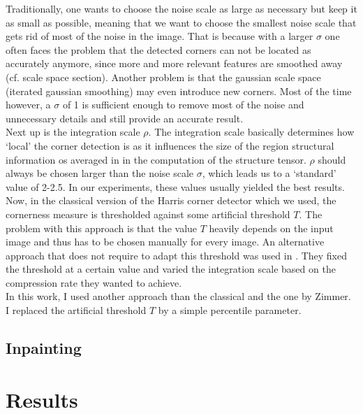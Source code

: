 Traditionally, one wants to choose the noise scale as large as necessary but keep it as small as
possible, meaning that we want to choose the smallest noise scale that gets rid of most of the
noise in the image. That is because with a larger $\sigma$ 
one often faces the problem that the detected corners can not be located as accurately anymore,
since more and more relevant features are smoothed away (cf. scale space section). Another problem
is that the gaussian scale space (iterated gaussian smoothing) may even introduce new corners.
 Most of the time however, a $\sigma$ of 1 is sufficient enough to remove most of the noise and unnecessary
 details and still provide an accurate result.\\
Next up is the integration scale $\rho$. The integration scale basically determines how `local' 
the corner detection is as it influences the size of the region structural information os averaged
in in the computation of the structure tensor. $\rho$ should always be chosen larger than the noise
scale $\sigma$, which leads us to a `standard' value of 2-2.5. In our experiments, these values
usually yielded the best results.\\
Now, in the classical version of the Harris corner detector which we used, the cornerness measure
is thresholded against some artificial threshold $T$. The problem with this approach is that the
value $T$ heavily depends on the input image and thus has to be chosen manually for every image. An
alternative approach that does not require to adapt this threshold was used in \cite{zimmer07}.
They fixed the threshold at a certain value and varied the integration scale based on the
compression rate they wanted to achieve.\\
In this work, I used another approach than the classical and the one by Zimmer\cite{zimmer07}.
I replaced the artificial threshold $T$ by a simple percentile parameter. 

\subsection{Inpainting}

\section{Results}\label{sec:Results}
